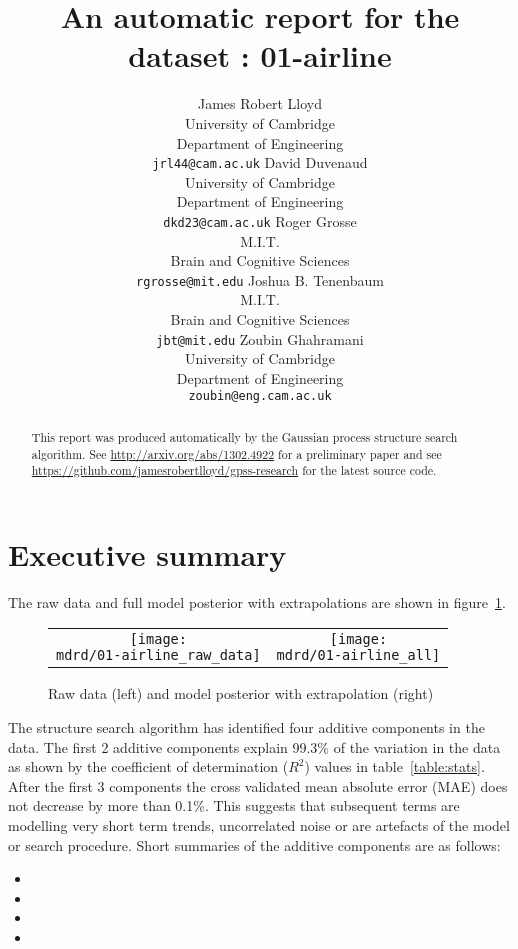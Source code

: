 \documentclass{article} %
\title{An automatic report for the dataset : 01-airline}
\author{
James Robert Lloyd\\
University of Cambridge\\
Department of Engineering\\
\texttt{jrl44@cam.ac.uk}
\And
David Duvenaud\\
University of Cambridge \\
Department of Engineering \\
\texttt{dkd23@cam.ac.uk}
\And
Roger Grosse\\
M.I.T.\\
Brain and Cognitive Sciences \\
\texttt{rgrosse@mit.edu}
\And
Joshua B. Tenenbaum\\
M.I.T.\\
Brain and Cognitive Sciences \\
\texttt{jbt@mit.edu}
\And
Zoubin Ghahramani\\
University of Cambridge \\
Department of Engineering \\
\texttt{zoubin@eng.cam.ac.uk}
}
\begin{document}
\allowdisplaybreaks

\maketitle

\begin{abstract}
This report was produced automatically by the Gaussian process structure search algorithm.
See \url{http://arxiv.org/abs/1302.4922} for a preliminary paper and see \url{https://github.com/jamesrobertlloyd/gpss-research} for the latest source code.
\end{abstract}

\section{Executive summary}

The raw data and full model posterior with extrapolations are shown in figure~\ref{fig:rawandfit}.

\begin{figure}[H]
\newcommand{\wmgd}{0.5\columnwidth}
\newcommand{\hmgd}{3.0cm}
\newcommand{\mdrd}{figures/01-airline}
\newcommand{\mbm}{\hspace{-0.3cm}}
\begin{tabular}{cc}
\mbm \texttt{[image: \\mdrd/01-airline\_raw\_data]} & \texttt{[image: \\mdrd/01-airline\_all]}
\end{tabular}
\caption{Raw data (left) and model posterior with extrapolation (right)}
\label{fig:rawandfit}
\end{figure}

The structure search algorithm has identified four additive components in the data.
The  first 2 additive components explain 99.3\% of the variation in the data as shown by the coefficient of determination ($R^2$) values in table~\ref{table:stats}.
After the first 3 components the cross validated mean absolute error (MAE) does not decrease by more than 0.1\%.
This suggests that subsequent terms are modelling very short term trends, uncorrelated noise or are artefacts of the model or search procedure.
Short summaries of the additive components are as follows:
\begin{itemize}

  \item  

  \item  

  \item  

  \item  

\end{itemize}
\end{document}
